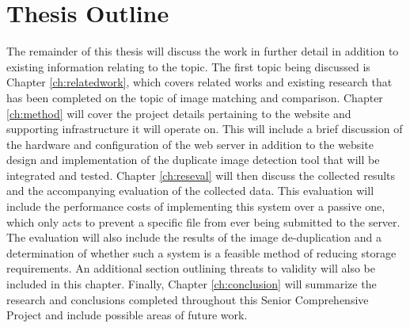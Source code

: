 \section{Thesis Outline}\label{sec:outline}
The remainder of this thesis will discuss the work in further detail in addition to existing information relating to the topic. The first topic being discussed is Chapter \ref{ch:relatedwork}, which covers related works and existing research that has been completed on the topic of image matching and comparison. Chapter \ref{ch:method} will cover the project details pertaining to the website and supporting infrastructure it will operate on. This will include a brief discussion of the hardware and configuration of the web server in addition to the website design and implementation of the duplicate image detection tool that will be integrated and tested. Chapter \ref{ch:reseval} will then discuss the collected results and the accompanying evaluation of the collected data. This evaluation will include the performance costs of implementing this system over a passive one, which only acts to prevent a specific file from ever being submitted to the server. The evaluation will also include the results of the image de-duplication and a determination of whether such a system is a feasible method of reducing storage requirements. An additional section outlining threats to validity will also be included in this chapter. Finally, Chapter \ref{ch:conclusion} will summarize the research and conclusions completed throughout this Senior Comprehensive Project and include possible areas of future work.